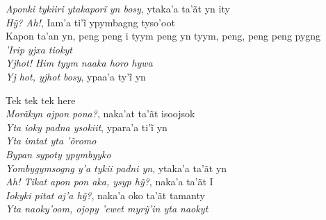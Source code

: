 \begin{linenumbers}
  \emph{Aponki tykiiri ytakaporĩ yn bosy}, ytaka’a ta’ãt yn ity\\
  \emph{Hỹ? Ah!}, Iam’a ti’ĩ ypymbagng tyso’oot\\
  Kapon ta'an yn, peng peng i tyym peng yn tyym, peng, peng peng pygng\\
  \emph{'Irip yjxa tiokyt}\\
  \emph{Yjhot! Him tyym naaka horo hywa}\\
  \emph{Yj hot, yjhot bosy}, ypaa’a ty’ĩ yn

\end{linenumbers}\endgroup

\bigskip

\begin{linenumbers}\begingroup\raggedright

\noindent   Tek tek tek here\\
  \emph{Morãkyn ajpon pona?}, naka'at ta'ãt isoojsok\\
  \emph{Yta ioky padna ysokiit}, ypara’a ti’ĩ yn\\
  \emph{Yta imtat yta 'õromo}\\
  \emph{Bypan sypoty ypymbyyko}\\
  \emph{Yombygymsogng y'a tykii padni yn}, ytaka'a ta'ãt yn\\
  \emph{Ah! Tikat apon pon aka, ysyp hỹ?}, naka’a ta’ãt I\\
  \emph{Iokyki pitat aj’a hỹ?}, naka’a oko ta’ãt tamanty\\
  \emph{Yta naoky’oom, ojopy ’ewet myrỹ’in yta naokyt}

\end{linenumbers}\endgroup

